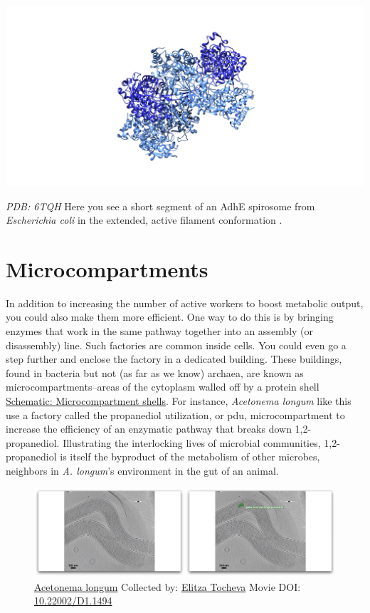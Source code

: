 \documentclass[]{tufte-book}
\begin{document}
\includegraphics{img/schematics/4_5_1}

\emph{PDB: 6TQH} Here you see a short segment of an AdhE spirosome from
\emph{Escherichia coli} in the extended, active filament conformation
\citep{pony2020}.

\section{Microcompartments}\label{microcompartments}

In addition to increasing the number of active workers to boost
metabolic output, you could also make them more efficient. One way to do
this is by bringing enzymes that work in the same pathway together into
an assembly (or disassembly) line. Such factories are common inside
cells. You could even go a step further and enclose the factory in a
dedicated building. These buildings, found in bacteria but not (as far
as we know) archaea, are known as microcompartments--areas of the
cytoplasm walled off by a protein shell
\protect\hyperlink{Microcompartment_shells}{Schematic: Microcompartment
shells}. For instance, \emph{Acetonema longum} like this use a factory
called the propanediol utilization, or pdu, microcompartment to increase
the efficiency of an enzymatic pathway that breaks down 1,2-propanediol.
Illustrating the interlocking lives of microbial communities,
1,2-propanediol is itself the byproduct of the metabolism of other
microbes, neighbors in \emph{A. longum}'s environment in the gut of an
animal.





\begin{figure}
\includegraphics{movie_stills/4_6} \caption[\protect\hyperlink{tree}{Acetonema longum} Collected by:
\protect\hyperlink{elitza_tocheva}{Elitza Tocheva} Movie DOI:
\href{https://doi.org/10.22002/D1.1494}{10.22002/D1.1494}]{\protect\hyperlink{tree}{Acetonema longum} Collected by:
\protect\hyperlink{elitza_tocheva}{Elitza Tocheva} Movie DOI:
\href{https://doi.org/10.22002/D1.1494}{10.22002/D1.1494}}\label{fig:4-6}
\end{figure}
\end{document}

